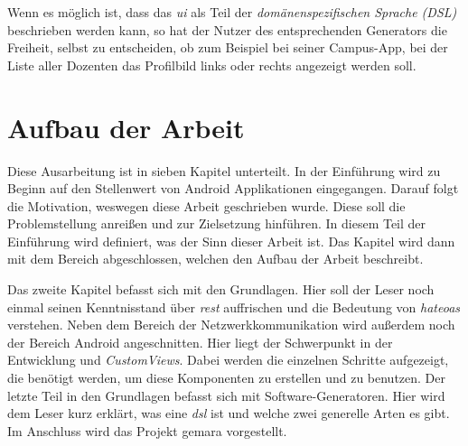 Wenn es möglich ist, dass das \textit{\ac{ui}} als Teil der \textit{domänenspezifischen Sprache (DSL)} beschrieben werden kann, so hat der Nutzer des entsprechenden Generators die Freiheit, selbst zu entscheiden, ob zum Beispiel bei seiner Campus-App, bei der Liste aller Dozenten das Profilbild links oder rechts angezeigt werden soll.

\section{Aufbau der Arbeit}\label{sec:structure}
Diese Ausarbeitung ist in sieben Kapitel unterteilt. In der Einführung wird zu Beginn auf den Stellenwert von Android Applikationen eingegangen. Darauf folgt die Motivation, weswegen diese Arbeit geschrieben wurde. Diese soll die Problemstellung anreißen und zur Zielsetzung hinführen. In diesem Teil der Einführung wird definiert, was der Sinn dieser Arbeit ist. Das Kapitel wird dann mit dem Bereich abgeschlossen, welchen den Aufbau der Arbeit beschreibt.

Das zweite Kapitel befasst sich mit den Grundlagen. Hier soll der Leser noch einmal seinen Kenntnisstand über \textit{\acf{rest}} auffrischen und die Bedeutung von \textit{\acf{hateoas}} verstehen. Neben dem Bereich der Netzwerkkommunikation wird außerdem noch der Bereich Android angeschnitten. Hier liegt der Schwerpunkt in der Entwicklung und \textit{CustomViews}. Dabei werden die einzelnen Schritte aufgezeigt, die benötigt werden, um diese Komponenten zu erstellen und zu benutzen. Der letzte Teil in den Grundlagen befasst sich mit Software-Generatoren. Hier wird dem Leser kurz erklärt, was eine \textit{\acf{dsl}} ist und welche zwei generelle Arten es gibt.
Im Anschluss wird das Projekt \acf{gemara} vorgestellt. 

